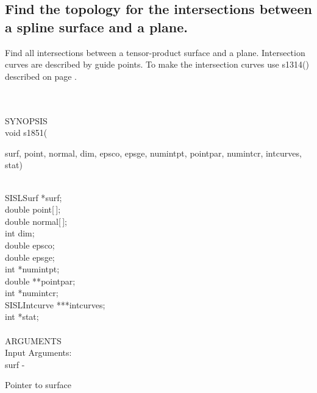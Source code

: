 \subsection{Find the topology for the intersections between a spline surface and a plane.}
\begin{minipg1}
  Find all intersections between a tensor-product surface and a plane.
  Intersection curves are described by guide points.
  To make the intersection curves use s1314() described on page \pageref{s1314}.
\end{minipg1} \\ \\
SYNOPSIS\\
        \>void s1851(\begin{minipg3}
                        {\fov surf}, {\fov point}, {\fov normal},
                {\fov dim}, {\fov epsco}, {\fov epsge}, {\fov numintpt},
                {\fov pointpar}, {\fov numintcr},
                        {\fov intcurves}, {\fov stat})
                \end{minipg3}\\[0.3ex]
                \>\>    SISLSurf        \>      *{\fov surf};\\
                \>\>    double  \>      {\fov point}[\,];\\
                \>\>    double  \>      {\fov normal}[\,];\\
                \>\>    int     \>      {\fov dim};\\
                \>\>    double  \>      {\fov epsco};\\
                \>\>    double  \>      {\fov epsge};\\
                \>\>    int     \>      *{\fov numintpt};\\
                \>\>    double  \>      **{\fov pointpar};\\
                \>\>    int     \>      *{\fov numintcr};\\
                \>\>    SISLIntcurve\>  ***{\fov intcurves};\\
                \>\>    int     \>      *{\fov stat};\\
\\
ARGUMENTS\\
        \>Input Arguments:\\
        \>\>    {\fov surf}\> - \>      \begin{minipg2}
                                Pointer to surface
                                \end{minipg2}\\
